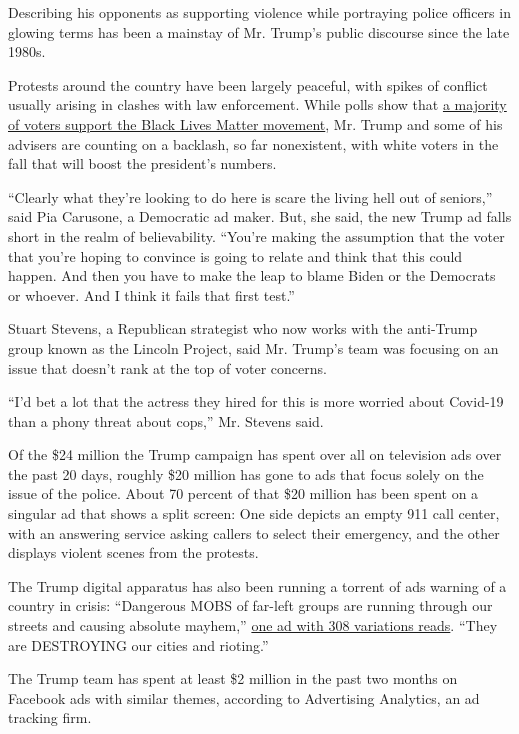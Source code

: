 Describing his opponents as supporting violence while portraying police
officers in glowing terms has been a mainstay of Mr. Trump's public
discourse since the late 1980s.

Protests around the country have been largely peaceful, with spikes of
conflict usually arising in clashes with law enforcement. While polls
show that
\href{https://www.nytimes.com/interactive/2020/06/10/upshot/black-lives-matter-attitudes.html}{a
majority of voters support the Black Lives Matter movement}, Mr. Trump
and some of his advisers are counting on a backlash, so far nonexistent,
with white voters in the fall that will boost the president's numbers.

``Clearly what they're looking to do here is scare the living hell out
of seniors,'' said Pia Carusone, a Democratic ad maker. But, she said,
the new Trump ad falls short in the realm of believability. ``You're
making the assumption that the voter that you're hoping to convince is
going to relate and think that this could happen. And then you have to
make the leap to blame Biden or the Democrats or whoever. And I think it
fails that first test.''

Stuart Stevens, a Republican strategist who now works with the
anti-Trump group known as the Lincoln Project, said Mr. Trump's team was
focusing on an issue that doesn't rank at the top of voter concerns.

``I'd bet a lot that the actress they hired for this is more worried
about Covid-19 than a phony threat about cops,'' Mr. Stevens said.

Of the \$24 million the Trump campaign has spent over all on television
ads over the past 20 days, roughly \$20 million has gone to ads that
focus solely on the issue of the police. About 70 percent of that \$20
million has been spent on a singular ad that shows a split screen: One
side depicts an empty 911 call center, with an answering service asking
callers to select their emergency, and the other displays violent scenes
from the protests.

The Trump digital apparatus has also been running a torrent of ads
warning of a country in crisis: ``Dangerous MOBS of far-left groups are
running through our streets and causing absolute mayhem,''
\href{https://www.facebook.com/ads/library/?id=281763573095189}{one ad
with 308 variations reads}. ``They are DESTROYING our cities and
rioting.''

The Trump team has spent at least \$2 million in the past two months on
Facebook ads with similar themes, according to Advertising Analytics, an
ad tracking firm.

